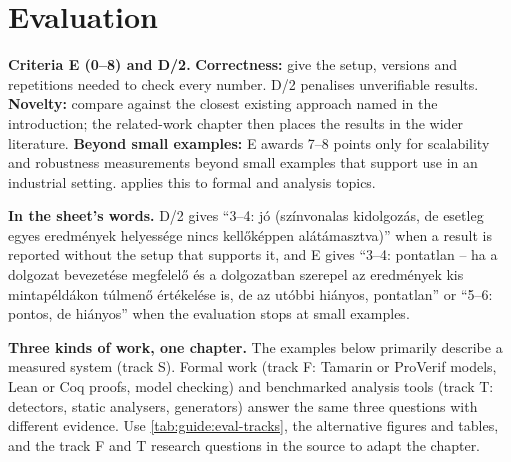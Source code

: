 \section{Evaluation}\label{app:chapters:evaluation}
\textbf{Criteria E (0--8) and D/2.}
\textbf{Correctness:} give the setup, versions and repetitions needed to check every number. D/2 penalises unverifiable results.
\textbf{Novelty:} compare against the closest existing approach named in the introduction; the related-work chapter then places the results in the wider literature.
\textbf{Beyond small examples:} E awards 7--8 points only for scalability and robustness measurements beyond small examples that support use in an industrial setting.  applies this to formal and analysis topics.

\textbf{In the sheet's words.} D/2 gives \enquote{3--4: jó (színvonalas kidolgozás, de esetleg egyes eredmények helyessége nincs kellőképpen alátámasztva)} when a result is reported without the setup that supports it, and E gives \enquote{3--4: pontatlan -- ha a dolgozat bevezetése megfelelő és a dolgozatban szerepel az eredmények kis mintapéldákon túlmenő értékelése is, de az utóbbi hiányos, pontatlan} or \enquote{5--6: pontos, de hiányos} when the evaluation stops at small examples.

\textbf{Three kinds of work, one chapter.} The examples below primarily describe a measured system (track S). Formal work (track F: Tamarin or ProVerif models, Lean or Coq proofs, model checking) and benchmarked analysis tools (track T: detectors, static analysers, generators) answer the same three questions with different evidence. Use \cref{tab:guide:eval-tracks}, the alternative figures and tables, and the track F and T research questions in the source to adapt the chapter.

